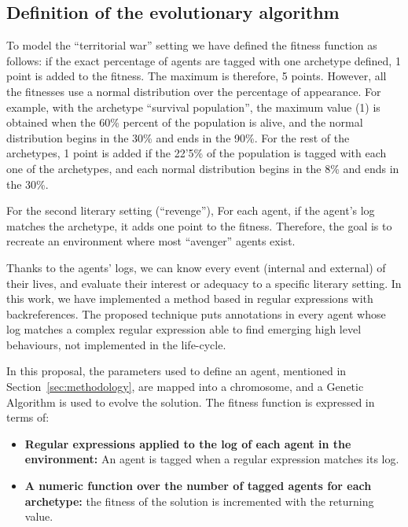 \documentclass{sig-alternate}
\begin{document}
\subsection{Definition of  the evolutionary algorithm}


To model the ``territorial war'' setting we have defined the fitness function as follows: if the exact percentage of agents are tagged with one archetype defined, 1 point is added to the fitness. The maximum is therefore, 5 points. However, all the fitnesses use a normal distribution over the percentage of appearance. For example, with the archetype ``survival population'', the maximum value (1) is obtained when the 60\% percent of the population is alive, and the normal distribution begins in the 30\% and ends in the 90\%. For the rest of the archetypes, 1 point is added if the 22'5\% of the population is tagged with each one of the archetypes, and each normal distribution begins in the 8\% and ends in the 30\%.

For the second literary setting (``revenge''), For each agent, if the agent's log matches the archetype, it adds one point to the fitness. Therefore, the goal is to recreate an environment where most ``avenger'' agents exist.

Thanks to the agents' logs, we can know every event (internal and
external) of their lives, and evaluate their interest or
adequacy to a specific literary setting.
In this work, we have implemented a method based in regular expressions with backreferences. The proposed technique puts annotations in every agent whose log matches a complex regular expression able to find emerging high level behaviours, not implemented in the life-cycle.

In this proposal, the parameters used to define an agent, mentioned in Section~\ref{sec:methodology}, are mapped into a chromosome, and a Genetic Algorithm is used to evolve the solution. The fitness function is expressed in terms of:

\begin{itemize}
\item \textbf{Regular expressions applied to the log of each agent in the environment:} An agent is tagged when a regular expression matches its log.
\item \textbf{A numeric function over the number of tagged agents for each archetype:} the fitness of the solution is incremented with the returning value.
\end{itemize}
\end{document}
